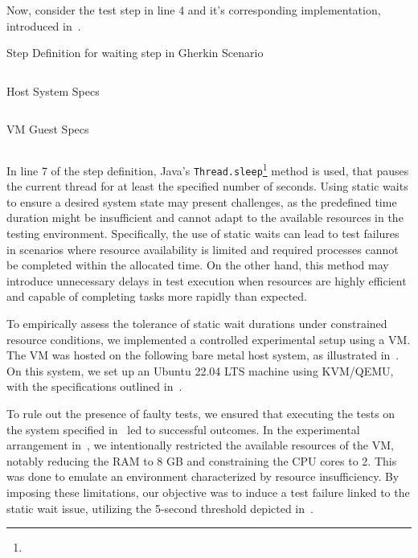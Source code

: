 Now, consider the test step in line 4 and it's corresponding implementation, introduced in~. 

\begin{listing}[!ht]
\caption{Step Definition for waiting step in Gherkin Scenario}
\label{lst:staticwait_impl}
\inputminted[linenos, xleftmargin=2em]{java}{files/code/staticwait_impl.java}
\end{listing}

\begin{listing}[!ht]
\caption{Host System Specs}
\label{lst:host-specs}
\inputminted{text}{files/neofetch-host.txt}
\end{listing}

\begin{listing}[!ht]
\caption{\acl{VM} Guest Specs}
\label{lst:vm-specs}
\inputminted{text}{files/neofetch-test-host.txt}
\end{listing}

In line 7 of the step definition, Java's \texttt{Thread.sleep}\footnote{} method is used, that pauses the current thread for at least the specified number of seconds. Using static waits to ensure a desired system state may present challenges, as the predefined time duration might be insufficient and cannot adapt to the available resources in the testing environment. Specifically, the use of static waits can lead to test failures in scenarios where resource availability is limited and required processes cannot be completed within the allocated time. On the other hand, this method may introduce unnecessary delays in test execution when resources are highly efficient and capable of completing tasks more rapidly than expected.

To empirically assess the tolerance of static wait durations under constrained resource conditions, we implemented a controlled experimental setup using a \ac{VM}. The \ac{VM} was hosted on the following bare metal host system, as illustrated in~. On this system, we set up an Ubuntu 22.04 LTS machine using KVM/QEMU, with the specifications outlined in~.

To rule out the presence of faulty tests, we ensured that executing the tests on the system specified in~ led to successful outcomes. In the experimental arrangement in~, we intentionally restricted the available resources of the \ac{VM}, notably reducing the RAM to 8 GB and constraining the CPU cores to 2. This was done to emulate an environment characterized by resource insufficiency. By imposing these limitations, our objective was to induce a test failure linked to the static wait issue, utilizing the 5-second threshold depicted in~. 

